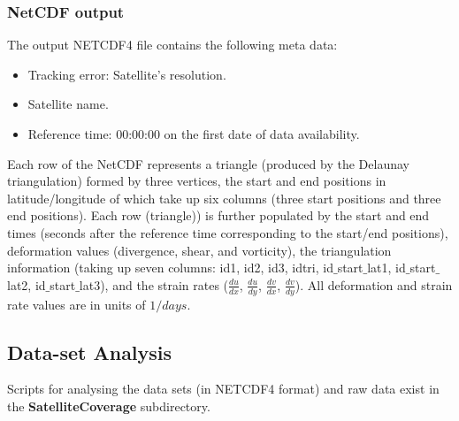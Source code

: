 \documentclass[12pt]{article}
\newcommand{\ode}[2]{\frac{d #1}{d #2}}
\begin{document}
\subsubsection*{NetCDF output}

The output NETCDF4 file contains the following meta data:

\begin{itemize}
    \item Tracking error: Satellite's resolution.
    \item Satellite name.
    \item Reference time: 00:00:00 on the first date of data availability.
\end{itemize}

Each row of the NetCDF represents a triangle (produced by the Delaunay triangulation) formed by three vertices, the start and end positions in latitude/longitude of which take up six columns (three start positions and three end positions). Each row (triangle)) is further populated by the start and end times (seconds after the reference time corresponding to the start/end positions), deformation values (divergence, shear, and vorticity), the triangulation information (taking up seven columns: id1, id2, id3, idtri, id$\_$start$\_$lat1, id$\_$start$\_$lat2, id$\_$start$\_$lat3), and the strain rates ($\ode{u}{x}$, $\ode{u}{y}$, $\ode{v}{x}$, $\ode{v}{y}$). All deformation and strain rate values are in units of $1/days$.

\subsection{Data-set Analysis}\label{structure}

Scripts for analysing the data sets (in NETCDF4 format) and raw data exist in the \textbf{SatelliteCoverage} subdirectory. 
\end{document}
